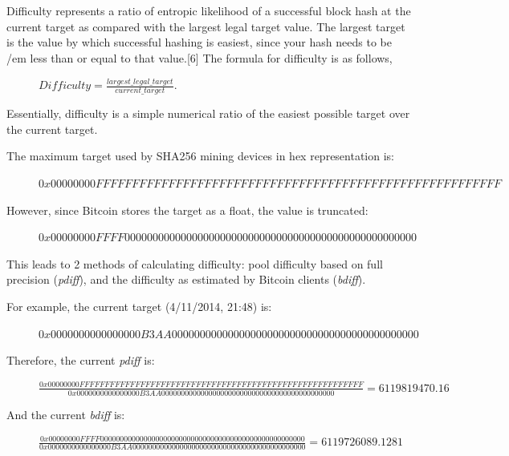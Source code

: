 \documentclass[pdftex,11pt]{article}
\begin{document}
Difficulty represents a ratio of entropic likelihood of a successful block hash at the current target as compared with the largest legal target value. The largest target is the value by which successful hashing is easiest, since your hash needs to be {/em less than or equal} to that value.[6] The formula for difficulty is as follows,
\begin{figure}[H]
	\centering
 	$Difficulty = \frac{largest\_legal\_target}{current\_target}$.
 \end{figure}


Essentially, difficulty is a simple numerical ratio of the easiest possible target over the current target.

The maximum target used by SHA256 mining devices in hex representation is:

\begin{figure}[H]
	\centering
 	$0x00000000FFFFFFFFFFFFFFFFFFFFFFFFFFFFFFFFFFFFFFFFFFFFFFFFFFFFFFFF$
 \end{figure}

However, since Bitcoin stores the target as a float, the value is truncated:
\begin{figure}[H]
	\centering
 	$0x00000000FFFF0000000000000000000000000000000000000000000000000000$
 \end{figure}

This leads to 2 methods of calculating difficulty: pool difficulty based on full precision ({\em pdiff}), and the difficulty as estimated by Bitcoin clients ({\em bdiff}).

For example, the current target (4/11/2014, 21:48) is: 
\begin{figure}[H]
	\centering
 	$0x0000000000000000B3AA00000000000000000000000000000000000000000000$
 \end{figure}


Therefore, the current {\em pdiff} is:
\begin{figure}[H]
	\centering
 	$\frac{0x00000000FFFFFFFFFFFFFFFFFFFFFFFFFFFFFFFFFFFFFFFFFFFFFFFFFFFFFFFF}{0x0000000000000000B3AA00000000000000000000000000000000000000000000} = 6119819470.16$
 \end{figure}

And the current {\em bdiff} is:
\begin{figure}[H]
	\centering
 	$\frac{0x00000000FFFF0000000000000000000000000000000000000000000000000000}{0x0000000000000000B3AA00000000000000000000000000000000000000000000} =  6119726089.1281$
 \end{figure}
\end{document}
